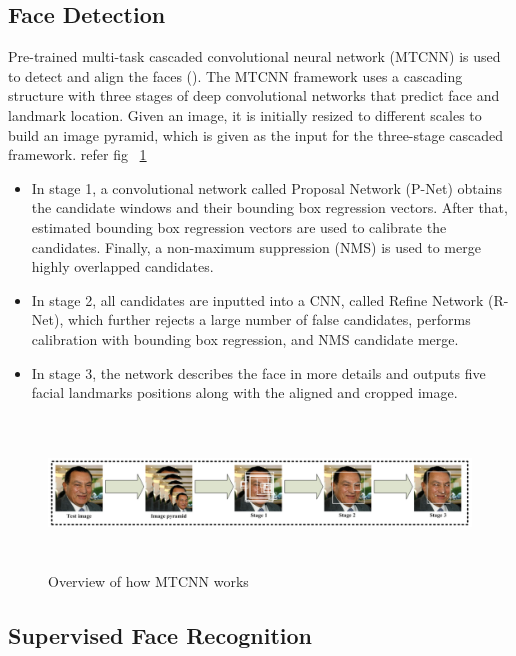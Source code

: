 \documentclass[a4paper,12pt, twoside]{NITKReport}
\begin{document}
\subsection{Face Detection}
Pre-trained  multi-task  cascaded  convolutional neural  network (MTCNN)  is used   to  detect  and  align  the  faces (\cite{zhang2014jointly}). The MTCNN framework uses a cascading  structure  with  three  stages  of  deep  convolutional networks that predict face and landmark location. Given an image, it is initially resized to different scales to build an image pyramid, which is given as the input for the three-stage cascaded framework. refer fig ~\ref{mtcnn} 
\begin{itemize}
\item In stage 1, a convolutional network called Proposal Network (P-Net) obtains the candidate windows and their bounding box regression vectors. After that, estimated bounding box regression vectors are used to calibrate the candidates.  Finally, a non-maximum suppression  (NMS)  is  used  to  merge  highly  overlapped candidates.
\item In stage 2,  all candidates are inputted into a CNN, called Refine Network (R-Net), which further rejects a  large  number  of  false  candidates,  performs  calibration with bounding box regression, and NMS candidate merge.
\item In stage 3, the network describes the face in more details and outputs five facial landmarks positions along with the aligned and cropped image. 
\end{itemize}   
\begin{figure} [h]
\centering
    \includegraphics[height=4cm,width=15cm]{mtcnn.png}
    \caption{Overview of how MTCNN works}
    \label{mtcnn}
\end{figure}

\subsection{Supervised Face Recognition}
\end{document}
